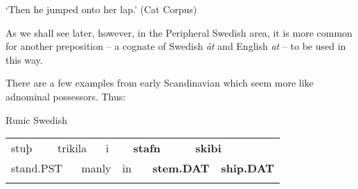 \begin{styleTranslation}
‘Then he jumped onto her lap.’ (Cat Corpus)

\end{styleTranslation}

\begin{styleBodyTextFirst}
As we shall see later, however, in the Peripheral Swedish area, it is more common for another preposition – a cognate of Swedish \textit{åt} and English \textit{at} – to be used in this way.

\end{styleBodyTextFirst}

\begin{styleBodytextC}
There are a few examples from early Scandinavian which seem more like adnominal possessors. Thus:

\end{styleBodytextC}

\begin{listWWNumileveli}
\item 

\end{listWWNumileveli}

\begin{listWWNumlxxvleveli}
\item 

\begin{styleExLtrTbl}
Runic Swedish

\end{styleExLtrTbl}

\end{listWWNumlxxvleveli}

\begin{tabular}{llllllllll}
\lsptoprule
stuþ & \multicolumn{2}{l}{trikila

} & \multicolumn{2}{l}{i

} & \multicolumn{2}{l}{{\bfseries stafn}

} & \multicolumn{2}{l}{{\bfseries skibi}

} & \\
\multicolumn{2}{l}{stand.PST

} & \multicolumn{2}{l}{manly

} & \multicolumn{2}{l}{in

} & \multicolumn{2}{l}{{\bfseries stem.DAT}

} & \multicolumn{2}{l}{{\bfseries ship.DAT}

}\\
\lspbottomrule
\end{tabular}

